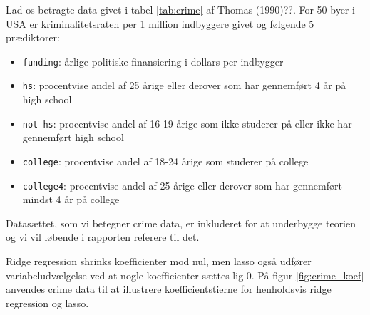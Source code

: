\begin{exmp}
Lad os betragte data givet i tabel \ref{tab:crime} af Thomas (1990)??.
For 50 byer i USA er kriminalitetsraten per 1 million indbyggere givet og følgende 5 prædiktorer: 
\begin{itemize}
\item \texttt{funding}: årlige politiske finansiering i dollars per indbygger
\item \texttt{hs}: procentvise andel af 25 årige eller derover som har gennemført 4 år på high school
\item \texttt{not-hs}: procentvise andel af 16-19 årige som ikke studerer på eller ikke har gennemført high school
\item \texttt{college}: procentvise andel af 18-24 årige som studerer på college
\item \texttt{college4}: procentvise andel af 25 årige eller derover som har gennemført mindst 4 år på college
\end{itemize}
%

%
Datasættet, som vi betegner crime data, er inkluderet for at underbygge teorien og vi vil løbende i rapporten referere til det.
\end{exmp}
Ridge regression shrinks koefficienter mod nul, men lasso også udfører variabeludvælgelse ved at nogle koefficienter sættes lig 0.
På figur \ref{fig:crime_koef} anvendes crime data til at illustrere koefficientstierne for henholdsvis ridge regression og lasso.
%
